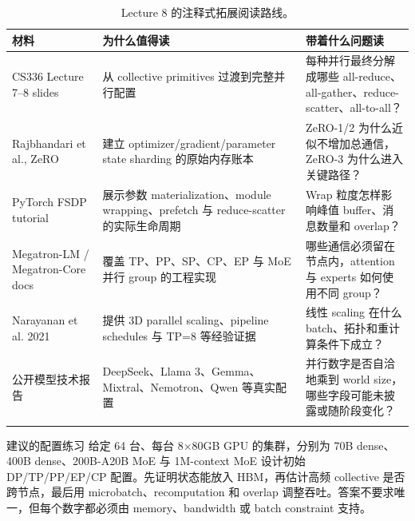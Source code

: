 \begin{longtable}{L{0.23\textwidth}L{0.31\textwidth}L{0.36\textwidth}}
\toprule
材料 & 为什么值得读 & 带着什么问题读 \\
\midrule
CS336 Lecture 7--8 slides & 从 collective primitives 过渡到完整并行配置 & 每种并行最终分解成哪些 all-reduce、all-gather、reduce-scatter、all-to-all？ \\
Rajbhandari et al., ZeRO & 建立 optimizer/gradient/parameter state sharding 的原始内存账本 & ZeRO-1/2 为什么近似不增加总通信，ZeRO-3 为什么进入关键路径？ \\
PyTorch FSDP tutorial & 展示参数 materialization、module wrapping、prefetch 与 reduce-scatter 的实际生命周期 & Wrap 粒度怎样影响峰值 buffer、消息数量和 overlap？ \\
Megatron-LM / Megatron-Core docs & 覆盖 TP、PP、SP、CP、EP 与 MoE 并行 group 的工程实现 & 哪些通信必须留在节点内，attention 与 experts 如何使用不同 group？ \\
Narayanan et al. 2021 & 提供 3D parallel scaling、pipeline schedules 与 TP=8 等经验证据 & 线性 scaling 在什么 batch、拓扑和重计算条件下成立？ \\
公开模型技术报告 & DeepSeek、Llama 3、Gemma、Mixtral、Nemotron、Qwen 等真实配置 & 并行数字是否自洽地乘到 world size，哪些字段可能未披露或随阶段变化？ \\
\bottomrule
\caption{Lecture 8 的注释式拓展阅读路线。}
\end{longtable}

\begin{importantbox}{建议的配置练习}
给定 64 台、每台 8×80GB GPU 的集群，分别为 70B dense、400B dense、200B-A20B MoE 与 1M-context MoE 设计初始 DP/TP/PP/EP/CP 配置。先证明状态能放入 HBM，再估计高频 collective 是否跨节点，最后用 microbatch、recomputation 和 overlap 调整吞吐。答案不要求唯一，但每个数字都必须由 memory、bandwidth 或 batch constraint 支持。
\end{importantbox}


